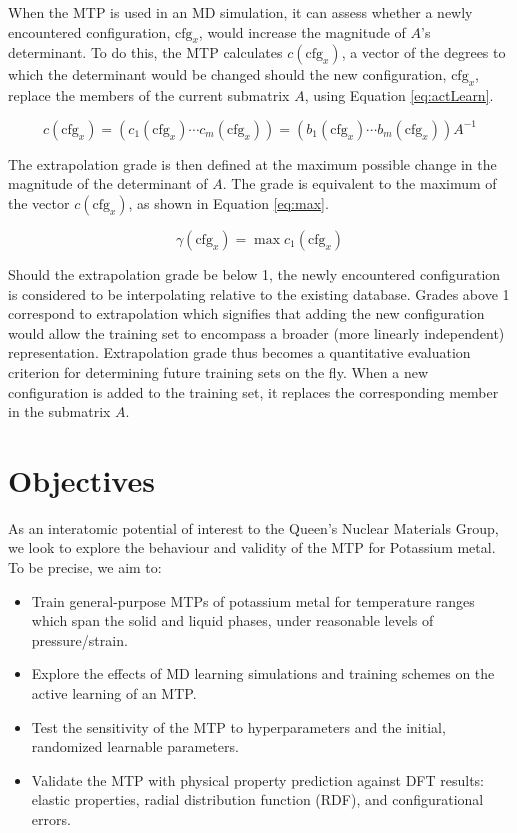\documentclass[9pt,twocolumn,twoside]{opticajnl}
\begin{document}
When the MTP is used in an MD simulation, it can assess whether a newly encountered configuration, $\textrm{cfg}_x$, would increase the magnitude of $A$'s determinant. To do this, the MTP calculates $c(\textrm{cfg}_x)$, a vector of the degrees to which the determinant would be changed should the new configuration, $\textrm{cfg}_x$, replace the members of the current submatrix $A$, using Equation \ref{eq:actLearn}. 

\begin{equation} \label{eq:actLearn}
  c(\textrm{cfg}_x)  = (c_1(\textrm{cfg}_x) \cdots c_m(\textrm{cfg}_x)) = (b_1(\textrm{cfg}_x) \cdots b_m(\textrm{cfg}_x)) A^{-1}
\end{equation}

The extrapolation grade is then defined at the maximum possible change in the magnitude of the determinant of $A$. The grade is equivalent to the maximum of the vector $c(\textrm{cfg}_x)$, as shown in Equation \ref{eq:max}.

\begin{equation}    \label{eq:max}
  \gamma(\textrm{cfg}_x) = \max c_1(\textrm{cfg}_x)
\end{equation}

Should the extrapolation grade be below 1, the newly encountered configuration is considered to be interpolating relative to the existing database. Grades above 1 correspond to extrapolation which signifies that adding the new configuration would allow the training set to encompass a broader (more linearly independent) representation. Extrapolation grade thus becomes a quantitative evaluation criterion for determining future training sets on the fly. When a new configuration is added to the training set, it replaces the corresponding member in the submatrix $A$.

\section{Objectives}
As an interatomic potential of interest to the Queen's Nuclear Materials Group, we look to explore the behaviour and validity of the MTP for Potassium metal. To be precise, we aim to:
\begin{itemize}
  \itemsep0em
  \item Train general-purpose MTPs of potassium metal for temperature ranges which span the solid and liquid phases, under reasonable levels of pressure/strain. 
  \item Explore the effects of MD learning simulations and training schemes on the active learning of an MTP.
  \item  Test the sensitivity of the MTP to hyperparameters and the initial, randomized learnable parameters. 
  \item Validate the MTP with physical property prediction against DFT results: elastic properties, radial distribution function (RDF), and configurational errors.
\end{itemize}
\end{document}

